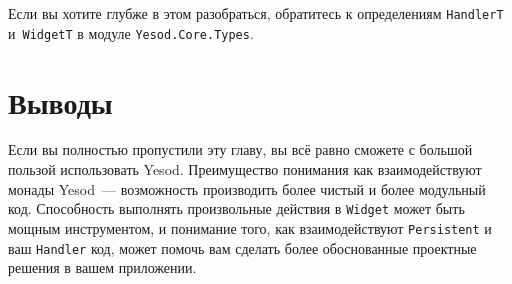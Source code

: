 Если вы хотите глубже в этом разобраться, обратитесь к определениям
\lstinline'HandlerT' и~\lstinline'WidgetT' в модуле
\lstinline'Yesod.Core.Types'.

\section{Выводы}
Если вы полностью пропустили эту главу, вы всё равно сможете с большой пользой
использовать Yesod. Преимущество понимания как взаимодействуют монады
Yesod~--- возможность производить более чистый и более модульный код. Способность
выполнять произвольные действия в \lstinline'Widget' может быть мощным инструментом, и
понимание того, как взаимодействуют \lstinline'Persistent' и ваш \lstinline'Handler' код,
может помочь вам сделать более обоснованные проектные решения в вашем приложении.
